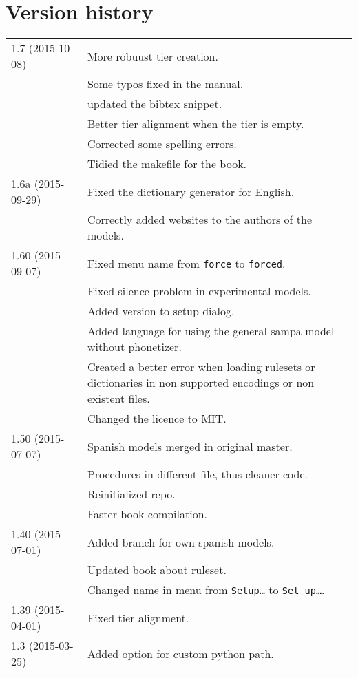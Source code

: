 \section{Version history}
\begin{longtable}{|p{0.22\linewidth}p{0.8\linewidth}|}
	\hline
	1.7 (2015-10-08) & \tabitem More robuust tier creation.\\
		& \tabitem Some typos fixed in the manual.\\
		& \tabitem updated the bibtex snippet.\\
		&	\tabitem Better tier alignment when the tier is empty.\\
		&	\tabitem Corrected some spelling errors.\\
		&	\tabitem Tidied the makefile for the book.\\
	\hline
	1.6a (2015-09-29) & \tabitem Fixed the dictionary generator for English.\\
		& \tabitem Correctly added websites to the authors of the models.\\
	\hline
	1.60 (2015-09-07) & \tabitem Fixed menu name from \texttt{force} to
\texttt{forced}.\\
		& \tabitem Fixed silence problem in experimental models.\\
		& \tabitem Added version to setup dialog.\\
		& \tabitem Added language for using the general sampa model without
			phonetizer.\\
		& \tabitem Created a better error when loading rulesets or dictionaries in
			non supported encodings or non existent files.\\
		& \tabitem Changed the licence to MIT.\\
	\hline
	1.50 (2015-07-07) & \tabitem Spanish models merged in original master.\\
		& \tabitem Procedures in different file, thus cleaner code.\\
		& \tabitem Reinitialized repo.\\
		& \tabitem Faster book compilation.\\
	\hline
	1.40 (2015-07-01) & \tabitem  Added branch for own spanish models.\\
		& \tabitem Updated book about ruleset.\\
		& \tabitem Changed name in menu from \texttt{Setup\ldots} to 
			\texttt{Set up\dots}.\\
	\hline
	1.39 (2015-04-01) & \tabitem Fixed tier alignment.\\
	\hline
	1.3 (2015-03-25) & \tabitem Added option for custom python path.\\

\end{longtable}
